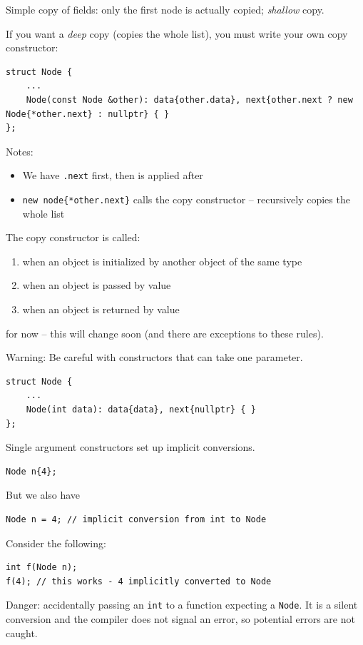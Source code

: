 \documentclass[11pt]{article}
\theoremstyle{definition}
\begin{document}

Simple copy of fields: only the first node is actually copied; \emph{shallow} copy.

If you want a \emph{deep} copy (copies the whole list), you must write your own copy constructor:
\begin{lstlisting}
struct Node {
    ...
    Node(const Node &other): data{other.data}, next{other.next ? new Node{*other.next} : nullptr} { }
};
\end{lstlisting}
Notes: \vspace{-0.25cm}
\begin{itemize}
    \item We have {\tt .next} first, then {\tt *} is applied after
    \item {\tt new node\{*other.next\}} calls the copy constructor -- recursively copies the whole list
\end{itemize}
The copy constructor is called: \vspace{-0.25cm}
\begin{enumerate}
    \item when an object is initialized by another object of the same type
    \item when an object is passed by value
    \item when an object is returned by value
\end{enumerate}
\vspace{-0.2cm}
for now -- this will change soon (and there are exceptions to these rules).

Warning: Be careful with constructors that can take one parameter. 
\begin{lstlisting}
struct Node {
    ...
    Node(int data): data{data}, next{nullptr} { }
};
\end{lstlisting}
Single argument constructors set up implicit conversions.
\begin{lstlisting}
Node n{4};
\end{lstlisting}
But we also have
\begin{lstlisting}
Node n = 4; // implicit conversion from int to Node
\end{lstlisting}
Consider the following:
\begin{lstlisting}
int f(Node n);
f(4); // this works - 4 implicitly converted to Node
\end{lstlisting}
Danger: accidentally passing an {\tt int} to a function expecting a {\tt Node}. It is a silent conversion and the compiler does not signal an error, so potential errors are not caught.
\end{document}
